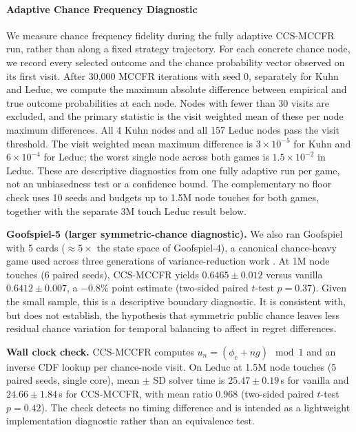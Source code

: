 \documentclass[11pt]{article}
\begin{document}
\paragraph{Adaptive Chance Frequency Diagnostic}
\label{app:adaptive-frequency}

We measure chance frequency fidelity during the fully adaptive CCS-MCCFR run, rather than along a fixed strategy trajectory. For each concrete chance node, we record every selected outcome and the chance probability vector observed on its first visit. After 30{,}000 MCCFR iterations with seed 0, separately for Kuhn and Leduc, we compute the maximum absolute difference between empirical and true outcome probabilities at each node. Nodes with fewer than 30 visits are excluded, and the primary statistic is the visit weighted mean of these per node maximum differences. All 4 Kuhn nodes and all 157 Leduc nodes pass the visit threshold. The visit weighted mean maximum difference is $3\times10^{-5}$ for Kuhn and $6\times10^{-4}$ for Leduc; the worst single node across both games is $1.5\times10^{-2}$ in Leduc. These are descriptive diagnostics from one fully adaptive run per game, not an unbiasedness test or a confidence bound. The complementary no floor check uses 10 seeds and budgets up to 1.5M node touches for both games, together with the separate 3M touch Leduc result below.

\textbf{Goofspiel-5 (larger symmetric-chance diagnostic).} We also ran Goofspiel with 5 cards ($\approx 5\times$ the state space of Goofspiel-4), a canonical chance-heavy game used across three generations of variance-reduction work \cite{lanctot2009monte,gibson2012generalized,farina2020stochastic}. At 1M node touches (6 paired seeds), CCS-MCCFR yields $0.6465 \pm 0.012$ versus vanilla $0.6412 \pm 0.007$, a $-0.8\%$ point estimate (two-sided paired $t$-test $p = 0.37$). Given the small sample, this is a descriptive boundary diagnostic. It is consistent with, but does not establish, the hypothesis that symmetric public chance leaves less residual chance variation for temporal balancing to affect in regret differences.

\textbf{Wall clock check.} CCS-MCCFR computes $u_n = (\phi_c + ng) \mod 1$ and an inverse CDF lookup per chance-node visit. On Leduc at 1.5M node touches (5 paired seeds, single core), mean $\pm$ SD solver time is $25.47 \pm 0.19$\,s for vanilla and $24.66 \pm 1.84$\,s for CCS-MCCFR, with mean ratio $0.968$ (two-sided paired $t$-test $p = 0.42$). The check detects no timing difference and is intended as a lightweight implementation diagnostic rather than an equivalence test.
\end{document}
